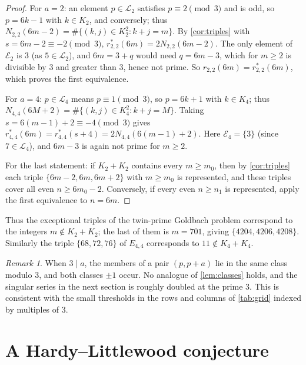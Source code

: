 \documentclass[11pt]{amsart}
\theoremstyle{definition}
\theoremstyle{remark}
\newtheorem{remark}[theorem]{Remark}
\newcommand{\Ls}{\mathcal{L}}
\newcommand{\Es}{\mathcal{E}}
\begin{document}
\begin{proof}
For $a=2$: an element $p\in\Ls_2$ satisfies $p\equiv 2\pmod 3$ and is odd, so $p=6k-1$ with $k\in K_2$, and conversely; thus $N_{2,2}(6m-2)=\#\{(k,j)\in K_2^2:k+j=m\}$. By \cref{cor:triples} with $s=6m-2\equiv -2\pmod 3$, $r^*_{2,2}(6m)=2N_{2,2}(6m-2)$. The only element of $\Es_2$ is $3$ (as $5\in\Ls_2$), and $6m=3+q$ would need $q=6m-3$, which for $m\ge2$ is divisible by $3$ and greater than $3$, hence not prime. So $r_{2,2}(6m)=r^*_{2,2}(6m)$, which proves the first equivalence.

For $a=4$: $p\in\Ls_4$ means $p\equiv 1\pmod 3$, so $p=6k+1$ with $k\in K_4$; thus $N_{4,4}(6M+2)=\#\{(k,j)\in K_4^2:k+j=M\}$. Taking $s=6(m-1)+2\equiv -4\pmod 3$ gives $r^*_{4,4}(6m)=r^*_{4,4}(s+4)=2N_{4,4}(6(m-1)+2)$. Here $\Es_4=\{3\}$ (since $7\in\Ls_4$), and $6m-3$ is again not prime for $m\ge 2$.

For the last statement: if $K_2+K_2$ contains every $m\ge m_0$, then by \cref{cor:triples} each triple $\{6m-2,6m,6m+2\}$ with $m\ge m_0$ is represented, and these triples cover all even $n\ge 6m_0-2$. Conversely, if every even $n\ge n_1$ is represented, apply the first equivalence to $n=6m$.
\end{proof}

Thus the exceptional triples of the twin-prime Goldbach problem correspond to the integers $m\notin K_2+K_2$; the last of them is $m=701$, giving $\{4204,4206,4208\}$. Similarly the triple $\{68,72,76\}$ of $E_{4,4}$ corresponds to $11\notin K_4+K_4$.

\begin{remark}
When $3\mid a$, the members of a pair $(p,p+a)$ lie in the same class modulo $3$, and both classes $\pm1$ occur. No analogue of \cref{lem:classes} holds, and the singular series in the next section is roughly doubled at the prime $3$. This is consistent with the small thresholds in the rows and columns of \cref{tab:grid} indexed by multiples of $3$.
\end{remark}

\section{A Hardy--Littlewood conjecture}\label{sec:heuristic}
\end{document}
